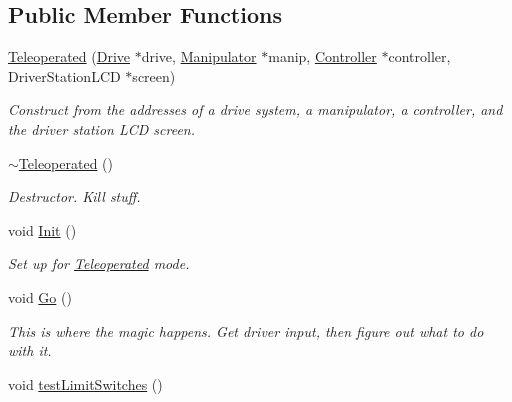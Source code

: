 \subsection*{Public Member Functions}
\begin{DoxyCompactItemize}
\item 
\hyperlink{class_r_j_f_r_c2011_1_1_teleoperated_a4faee78835700892307b89c9977f523e}{Teleoperated} (\hyperlink{class_r_j_f_r_c2011_1_1_drive}{Drive} $\ast$drive, \hyperlink{class_r_j_f_r_c2011_1_1_manipulator}{Manipulator} $\ast$manip, \hyperlink{class_r_j_f_r_c2011_1_1_controller}{Controller} $\ast$controller, DriverStationLCD $\ast$screen)
\begin{DoxyCompactList}\small\item\em Construct from the addresses of a drive system, a manipulator, a controller, and the driver station LCD screen. \item\end{DoxyCompactList}\item 
\hypertarget{class_r_j_f_r_c2011_1_1_teleoperated_a19603fc214137c80b292de4ccf5fd3ec}{
\hyperlink{class_r_j_f_r_c2011_1_1_teleoperated_a19603fc214137c80b292de4ccf5fd3ec}{$\sim$Teleoperated} ()}
\label{class_r_j_f_r_c2011_1_1_teleoperated_a19603fc214137c80b292de4ccf5fd3ec}

\begin{DoxyCompactList}\small\item\em Destructor. Kill stuff. \item\end{DoxyCompactList}\item 
\hypertarget{class_r_j_f_r_c2011_1_1_teleoperated_a12d319115a887d3308c5f0a74d0df10f}{
void \hyperlink{class_r_j_f_r_c2011_1_1_teleoperated_a12d319115a887d3308c5f0a74d0df10f}{Init} ()}
\label{class_r_j_f_r_c2011_1_1_teleoperated_a12d319115a887d3308c5f0a74d0df10f}

\begin{DoxyCompactList}\small\item\em Set up for \hyperlink{class_r_j_f_r_c2011_1_1_teleoperated}{Teleoperated} mode. \item\end{DoxyCompactList}\item 
void \hyperlink{class_r_j_f_r_c2011_1_1_teleoperated_a22fa5b99fdf48c16e4f86db0bb0f4c02}{Go} ()
\begin{DoxyCompactList}\small\item\em This is where the magic happens. Get driver input, then figure out what to do with it. \item\end{DoxyCompactList}\item 
\hypertarget{class_r_j_f_r_c2011_1_1_teleoperated_a885303324836622da915a1204ac5e9bf}{
void \hyperlink{class_r_j_f_r_c2011_1_1_teleoperated_a885303324836622da915a1204ac5e9bf}{testLimitSwitches} ()}
\label{class_r_j_f_r_c2011_1_1_teleoperated_a885303324836622da915a1204ac5e9bf}


\end{DoxyCompactItemize}
